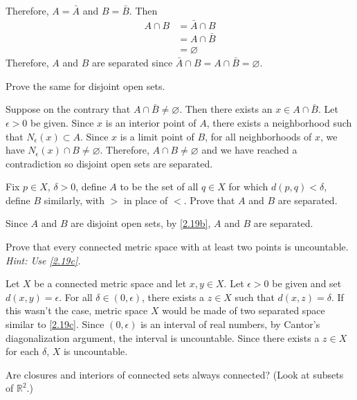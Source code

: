 \begin{exercise}
\begin{exercise}[label = (\alph*), ref = \arabic{exercisei} (\alph*)]
    Therefore, \(A = \bar{A}\) and \(B = \bar{B}\).
    Then
    \begin{align*}
      A\cap B & = \bar{A}\cap B\\
              & = A\cap\bar{B}\\
              & = \varnothing
    \end{align*}
    Therefore, \(A\) and \(B\) are separated since
    \(\bar{A}\cap B = A\cap\bar{B} = \varnothing\).
  \item
    \label{2.19b}
    Prove the same for disjoint open sets.
    \par\smallskip
    Suppose on the contrary that \(A\cap\bar{B}\neq\varnothing\).
    Then there exists an \(x\in A\cap\bar{B}\).
    Let \(\epsilon > 0\) be given.
    Since \(x\) is an interior point of \(A\), there exists a neighborhood such
    that \(N_{\epsilon}(x)\subset A\).
    Since \(x\) is a limit point of \(B\), for all neighborhoods of \(x\), we
    have \(N_{\epsilon}(x)\cap B\neq\varnothing\).
    Therefore, \(A\cap B\neq\varnothing\) and we have reached a contradiction
    so disjoint open sets are separated.
  \item
    \label{2.19c}
    Fix \(p\in X\), \(\delta > 0\), define \(A\) to be the set of all
    \(q\in X\) for which \(d(p, q) < \delta\), define \(B\) similarly, with
    \(>\) in place of \(<\).
    Prove that \(A\) and \(B\) are separated.
    \par\smallskip
    Since \(A\) and \(B\) are disjoint open sets, by \cref{2.19b}, \(A\) and
    \(B\) are separated.
  \item
    Prove that every connected metric space with at least two points is
    uncountable.
    \textit{Hint: Use \cref{2.19c}.}
    \par\smallskip
    Let \(X\) be a connected metric space and let \(x,y\in X\).
    Let \(\epsilon > 0\) be given and set \(d(x,y) = \epsilon\).
    For all \(\delta\in (0, \epsilon)\), there exists a \(z\in X\) such that
    \(d(x,z) = \delta\).
    If this wasn't the case, metric space \(X\) would be made of two separated
    space similar to \cref{2.19c}.
    Since \((0,\epsilon)\) is an interval of real numbers, by Cantor's
    diagonalization argument, the interval is uncountable.
    Since there exists a \(z\in X\) for each \(\delta\), \(X\) is uncountable.
  \end{exercise}
\item
  Are closures and interiors of connected sets always connected?
  (Look at subsets of \(\mathbb{R}^2\).)
  \par\smallskip

\end{exercise}
